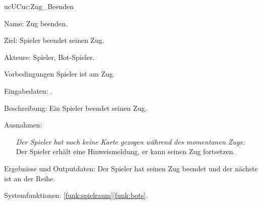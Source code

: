 \begin{description}[leftmargin=5em, style=sameline]
	\begin{lhp}{uc}{UC}{uc:Zug_Beenden}
		\item [Name:] Zug beenden.
		\item [Ziel:] Spieler beendet seinen Zug.
		\item [Akteure:] Spieler, Bot-Spieler.
		\item [Vorbedingungen] Spieler ist am Zug.
		\item [Eingabedaten:] .
		\item [Beschreibung:] Ein Spieler beendet seinen Zug.
		\item [Ausnahmen:] \hfill
			\begin{itemize} 
				\item[] \textit{Der Spieler hat noch keine Karte gezogen während des momentanen Zugs:} Der Spieler erhält eine Hinweismeldung, er kann seinen Zug fortsetzen.
			\end{itemize}
		\item [Ergebnisse und Outputdaten:] Der Spieler hat seinen Zug beendet und der nächste ist an der Reihe.
		\item [Systemfunktionen:] \ref{funk:spielraum}\ref{funk:bots}.
	\end{lhp}

\end{description}